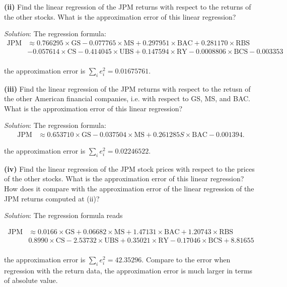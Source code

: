 \documentclass[paper=a4, fontsize=11pt]{scrartcl} %
\numberwithin{equation}{section} %
\numberwithin{figure}{section} %
\numberwithin{table}{section} %
\begin{document}
\textbf{(ii)} Find the linear regression of the JPM returns with respect
to the returns of the other stocks. What is the approximation error of this 
linear regression?

\textit{Solution}: The regression formula:
\begin{equation}
\begin{split}
\nonumber
\text{JPM} &\approx 0.766295\times\text{GS} -0.077765\times\text{MS} + 0.297951\times\text{BAC} + 0.281170\times\text{RBS}\\
    &  -0.057614\times\text{CS}  -0.414045\times\text{UBS} + 0.147594\times\text{RY}  -0.0008806 \times\text{BCS}-0.003353 \\
\end{split}
\end{equation}

the approximation error is $\sum\limits_{i}e_i^2 = 0.01675761$. 


\textbf{(iii)} Find the linear regression of the JPM returns with respect to the retusn of the other American financial companies, i.e.
with respect to GS, MS, and BAC. What is the approximation error of this linear regression?

\textit{Solution}: The regression formula:
\begin{equation}
\begin{split}
\nonumber
\text{JPM} &\approx 0.653710\times\text{GS}  -0.037504\times\text{MS} + 0.261285S \times\text{BAC} -0.001394.
\end{split}
\end{equation}

the approximation error is $\sum\limits_{i}e_i^2 = 0.02246522$.

\textbf{(iv)} Find the linear regression of the JPM stock prices with respect to
the prices of the other stocks. What is the approximation error of this linear regression?
How does it compare with the approximation error of the linear regression of the JPM
returns computed at (ii)?

\textit{Solution}: The regression formula reads

\begin{equation}
\begin{split}
\nonumber
\text{JPM} &\approx 0.0166\times\text{GS} +0.06682\times\text{MS} + 1.47131\times\text{BAC} + 1.20743\times\text{RBS}\\
    &  0.8990\times\text{CS}  -2.53732\times\text{UBS} + 0.35021\times\text{RY}  -0.17046\times\text{BCS}+8.81655 \\
\end{split}
\end{equation}

the approximation error is $\sum\limits_{i}e_i^2 = 42.35296$. Compare to the error when regression with the return data, the approximation error is much larger in terms of absolute value.
\newpage
\end{document}
